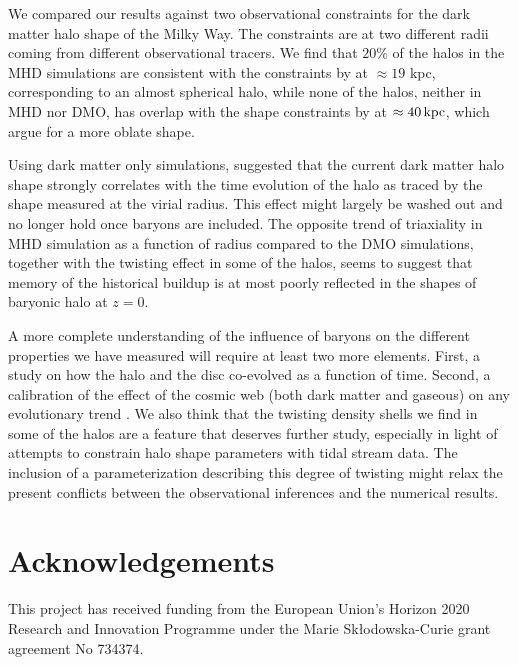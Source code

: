 \documentclass[usenatbib]{mnras}
\begin{document}
We compared our results against two observational constraints for the
dark matter halo shape of the Milky Way. The constraints are at two different radii
coming from different observational tracers. 
We find that $20\%$ of the halos in the MHD simulations are consistent with
the constraints by \cite{Bovy16} at $\approx 19$ kpc,  corresponding to
an almost spherical halo, while none of the halos, neither in MHD nor
DMO, has overlap with the shape constraints by \cite{LM10} at
$\approx 40\,{\rm kpc}$, which argue for a more oblate shape.

Using dark matter only simulations, \citet{VeraCiro11} suggested that
the current dark matter halo shape strongly correlates with the time
evolution of the halo as traced by the shape measured at the virial radius. 
This effect might largely be washed out and no longer hold once baryons are included. 
The opposite trend of triaxiality in MHD simulation as a function of
radius compared to the DMO simulations, together with the twisting effect in some of 
the halos, seems to suggest that memory of the historical buildup is at most poorly 
reflected in the shapes of baryonic halo at $z=0$.


A more complete understanding of the influence of baryons on the
different properties we have measured will require at least two more elements.
First, a study on how the halo and the disc co-evolved as a
function of time. Second, a calibration of the effect of the cosmic web
(both dark matter and gaseous) on any evolutionary trend
\citep{2014MNRAS.443.1090F, 2017MNRAS.469..594B, 2019MNRAS.487.1607G}.
We also think  that the twisting density shells we find in
some of the halos are a feature that deserves further study, especially
in light of attempts to  constrain halo shape parameters with tidal stream data.  The
inclusion of a parameterization describing this degree of twisting
might relax the present conflicts between the observational inferences and the
numerical results.  


\section*{Acknowledgements}
This project has received funding from the European Union's Horizon
2020 Research and Innovation Programme under the Marie
Sk\l{}odowska-Curie grant agreement No 734374. 



\end{document}
